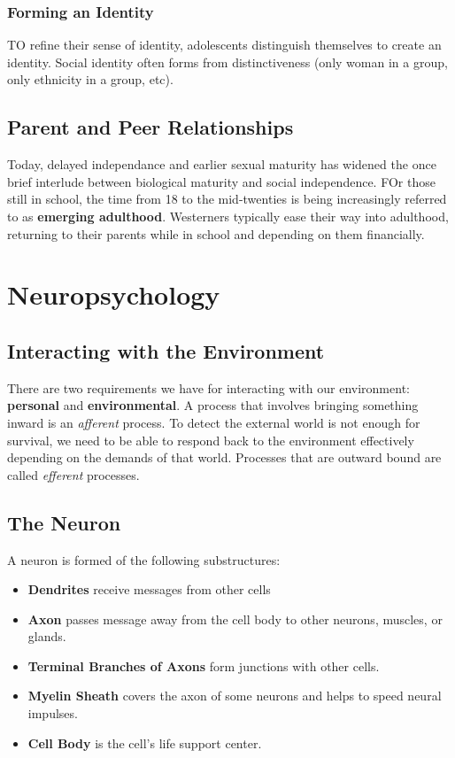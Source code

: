 \documentclass[12pt]{article}
\begin{document}
\subsubsection*{Forming an Identity}
TO refine their sense of identity, adolescents distinguish themselves to create an identity. Social identity often forms from distinctiveness (only woman in a group, only ethnicity in a group, etc).

\subsection*{Parent and Peer Relationships}
Today, delayed independance and earlier sexual maturity has widened the once brief interlude between biological maturity and social independence. FOr those still in school, the time from 18 to the mid-twenties is being increasingly referred to as {\bf emerging adulthood}. Westerners typically ease their way into adulthood, returning to their parents while in school and depending on them financially.

\section*{Neuropsychology}
\subsection*{Interacting with the Environment}
There are two requirements we have for interacting with our environment: \textbf{personal} and \textbf{environmental}. A process that involves bringing something inward is an {\it afferent} process. To detect the external world is not enough for survival, we need to be able to respond back to the environment effectively depending on the demands of that world. Processes that are outward bound are called {\it efferent} processes. 

\subsection*{The Neuron}
A neuron is formed of the following substructures:
\begin{itemize}
\item {\bf Dendrites} receive messages from other cells
\item {\bf Axon} passes message away from the cell body to other neurons, muscles, or glands.
\item {\bf Terminal Branches of Axons} form junctions with other cells.
\item {\bf Myelin Sheath} covers the axon of some neurons and helps to speed neural impulses.
\item {\bf Cell Body} is the cell's life support center.
\end{itemize}
\end{document}
